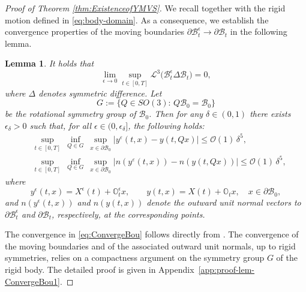 \documentclass[11pt,twoside,reqno]{amsart}
\numberwithin{equation}{section}
\numberwithin{figure}{section}
\newtheorem{lemma}{Lemma}[section]
\begin{document}
\begin{proof}[Proof of Theorem \ref{thm:ExistenceofYMVS}]
We recall \cite[Lemma 5.4]{gerard2014existence} together with the rigid motion defined in \eqref{eq:body-domain}. As a consequence, we establish the convergence properties of the moving boundaries $\partial\mathcal{B}_t^\epsilon \to \partial\mathcal{B}_t$ in the following lemma.

\begin{lemma}\label{lem:ConvergeBou1}
It holds that
\begin{equation}\label{eq:ConvergeBou}
  \lim_{\epsilon \to 0} 
  \sup_{t \in [0,T]} 
  \mathcal{L}^3\!\Big(\mathcal{B}_t^\epsilon \Delta \mathcal{B}_t\Big) = 0,
\end{equation}
where $\Delta$ denotes symmetric difference. Let
\begin{equation}
    G:=\{Q\in SO(3):\, Q\mathcal{B}_0=\mathcal{B}_0\}
\end{equation}
be the rotational symmetry group of $\mathcal{B}_0$. Then for any $\delta \in (0,1)$ there exists $\epsilon_\delta > 0$ such that, for all $\epsilon \in (0,\epsilon_\delta]$, the following holds:
\begin{equation}\label{eq:ConvergeBoundary}
\begin{aligned}
&\sup_{t\in[0,T]}\ \inf_{Q\in G}\ \sup_{x\in\partial\mathcal{B}_0}
\big|y^\varepsilon(t,x)-y(t,Qx)\big|
\le \mathcal{O}(1)\,\delta^5,\\[2pt]
&\sup_{t\in[0,T]}\ \inf_{Q\in G}\ \sup_{x\in\partial\mathcal{B}_0}
\big|n(y^\varepsilon(t,x))-n(y(t,Qx))\big|
\le \mathcal{O}(1)\,\delta^5,
\end{aligned}
\end{equation}
where 
\[
y^\epsilon(t,x) = X^\epsilon(t) + \mathbb{O}_t^\epsilon x, 
\qquad 
y(t,x) = X(t) + \mathbb{O}_t x, 
\quad x \in \partial\mathcal{B}_0,
\]
and $n(y^\epsilon(t,x))$ and $n(y(t,x))$ denote the outward unit normal vectors to $\partial\mathcal{B}_t^\epsilon$ and $\partial\mathcal{B}_t$, respectively, at the corresponding points.
\end{lemma}

The convergence in \eqref{eq:ConvergeBou} follows directly from \cite[Lemma~5.4]{gerard2014existence}.
The convergence of the moving boundaries
and of the associated outward unit normals, up to rigid symmetries, relies on
a compactness argument on the symmetry group $G$ of the rigid body. The detailed proof is given in Appendix~\ref{app:proof-lem-ConvergeBou1}.






\end{proof}
\end{document}
